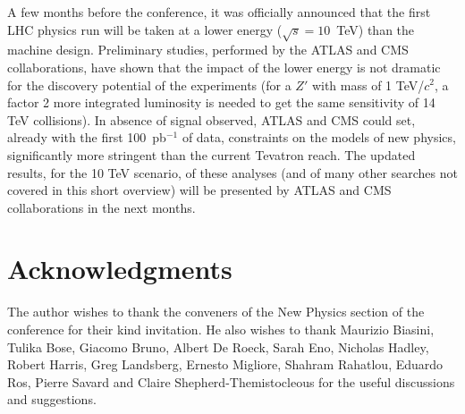 \documentclass{cmspaper}
\begin{document}
A few months before the conference, it was officially announced 
that the first LHC physics run will be taken at a lower energy 
($\sqrt{s} = 10$~TeV) than the machine design. Preliminary 
studies, performed by the ATLAS and CMS collaborations, 
have shown that the impact of the lower energy is not dramatic for the 
discovery potential of the experiments (for a $Z'$ with mass of 1 TeV/$c^2$, 
a factor 2 more integrated luminosity is needed to get the same 
sensitivity of 14 TeV collisions). 
In absence of signal observed, ATLAS and CMS could set, already with the 
first 100~pb$^{-1}$ of data, constraints on the models of new physics, 
significantly more stringent than the current Tevatron reach. 
The updated results, for the 10 TeV scenario, of these analyses (and of 
many other searches not covered in this short overview) 
will be presented by ATLAS and CMS collaborations 
in the next months.

\section{Acknowledgments}
The author wishes to thank the conveners of the New Physics 
section of the conference for their kind invitation. 
He also wishes to thank Maurizio Biasini, Tulika Bose, Giacomo Bruno, Albert De Roeck, Sarah Eno, Nicholas Hadley, 
Robert Harris, Greg Landsberg, Ernesto Migliore, Shahram Rahatlou, Eduardo Ros, Pierre Savard and Claire 
Shepherd-Themistocleous  for the useful discussions and suggestions.




\end{document}
